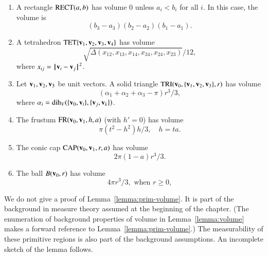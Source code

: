 \begin{lemma}\label{lemma:prim-volume} 
\begin{enumerate} 
\item A rectangle ${\operatorname{RECT}}(a,b)$
has volume $0$ unless $a_i<b_i$ for all $i$.  In this case, the
volume is
\[ (b_3-a_3)(b_2-a_2)(b_1-a_1).\] 
\item A tetrahedron ${\operatorname{TET}}\{{\mathbf v}_1,{\mathbf v}_2,{\mathbf v}_3,{\mathbf v}_4\}$
has volume
\[ 
\sqrt{\Delta(x_{12},x_{13},x_{14},x_{34},x_{24},x_{23})}/12,
\] 
where $x_{ij} = \norm{\v_i}{\v_j}^2$.
\item  Let ${\mathbf v}_1,{\mathbf v}_2,{\mathbf v}_3$ be unit vectors.  A solid
triangle ${\operatorname{TRI}}({\mathbf v}_0,\{{\mathbf v}_1,{\mathbf v}_2,{\mathbf v}_3\},r)$ has
volume
\[ 
(\alpha_1+\alpha_2+\alpha_3-\pi)r^3/3,
\] 
where $\alpha_i = \operatorname{dih}_V(\{{\mathbf v}_0,{\mathbf v}_i\},\{{\mathbf v}_j,{\mathbf v}_k\})$.
\item  The frustum ${\operatorname{FR}}({\mathbf v}_0,{\mathbf v}_1,h,a)$ (with $h'=0$) 
has volume
\[ 
\pi (t^2-h^2) h/3,\quad h = t a.
\] 
\item  The conic cap ${\operatorname{CAP}}({\mathbf v}_0,{\mathbf v}_1,r,a)$
has volume
\[ 
2\pi(1-a) r^3/3.
\] 
\item The ball $B({\mathbf v}_0,r)$ has volume
\[ 
4\pi r^3/3,\text{ when } r \ge 0,
\] 
\end{enumerate}
\end{lemma}



We do not give a proof of Lemma~\ref{lemma:prim-volume}.  It is part 
of the background in measure theory assumed at the beginning of the chapter.
(The enumeration of background properties of volume in 
Lemma~\ref{lemma:volume} makes a forward
reference to Lemma~\ref{lemma:prim-volume}.)  The measurability
of these primitive regions is also part of the background assumptions.
An incomplete sketch of the lemma follows.

